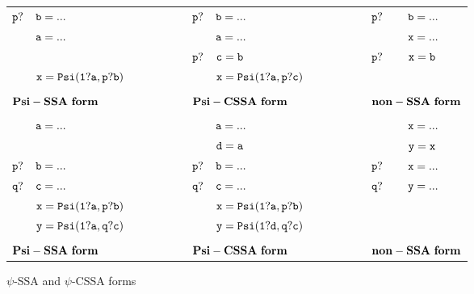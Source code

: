 \begin{figure*}
\begin{center}
\footnotesize
\begin{tabular}{llllllll}
${\tt p?}$ & ${\tt b = ...}$ & \ \ \ \ \ \ \ \  & ${\tt p?}$ & ${\tt b = ...}$ & \ \ \ \ \ \ \ \  & ${\tt p?}$ & ${\tt b = ...}$ \\
            & ${\tt a = ...}$ & \ \ \ \ \ \ \ \  &            & ${\tt a = ...}$ & \ \ \ \ \ \ \ \  &            & ${\tt x = ...}$ \\
            &                 & \ \ \ \ \ \ \ \  & ${\tt p?}$ & ${\tt c = b}$   & \ \ \ \ \ \ \ \  & ${\tt p?}$ & ${\tt x = b}$ \\
            & ${\tt x = Psi(1?a,p?b)}$ & \ \ \ \ \ \ \ \  &   & ${\tt x = Psi(1?a,p?c)}$  & \ \ \ \ \ \ \ \ &   & \\
\\
\multicolumn{2}{l}{${\tt {\bf Psi-SSA\ form}}$} & \ \ \ \ \ \ \ \  &\multicolumn{2}{l}{${\tt {\bf Psi-CSSA\ form}}$} & \ \ \ \ \ \ \ \  &\multicolumn{2}{l}{${\tt {\bf non-SSA\ form}}$} \\
\\
            & ${\tt a = ...}$ & \ \ \ \ \ \ \ \  &            & ${\tt a = ...}$ & \ \ \ \ \ \ \ \  &            & ${\tt x = ...}$ \\
            &                 & \ \ \ \ \ \ \ \  &            & ${\tt d = a}$ & \ \ \ \ \ \ \ \  &            & ${\tt y = x}$ \\
${\tt p?}$ & ${\tt b = ...}$ & \ \ \ \ \ \ \ \  & ${\tt p?}$ & ${\tt b = ...}$ & \ \ \ \ \ \ \ \  & ${\tt p?}$ & ${\tt x = ...}$ \\
${\tt q?}$ & ${\tt c = ...}$ & \ \ \ \ \ \ \ \  & ${\tt q?}$ & ${\tt c = ...}$ & \ \ \ \ \ \ \ \  & ${\tt q?}$ & ${\tt y = ...}$ \\
           & ${\tt x = Psi(1?a,p?b)}$ & \ \ \ \ \ \ \ \  &   & ${\tt x = Psi(1?a,p?b)}$  & \ \ \ \ \ \ \ \ &   & \\
           & ${\tt y = Psi(1?a,q?c)}$ & \ \ \ \ \ \ \ \  &   & ${\tt y = Psi(1?d,q?c)}$  & \ \ \ \ \ \ \ \ &   & \\
\\
\multicolumn{2}{l}{${\tt {\bf Psi-SSA\ form}}$} & \ \ \ \ \ \ \ \  &\multicolumn{2}{l}{${\tt {\bf Psi-CSSA\ form}}$} & \ \ \ \ \ \ \ \  &\multicolumn{2}{l}{${\tt {\bf non-SSA\ form}}$} \\
\end{tabular}
\caption{$\psi$-SSA and $\psi$-CSSA forms}
\label{fig:psi-interference}
\end{center}
\end{figure*}

